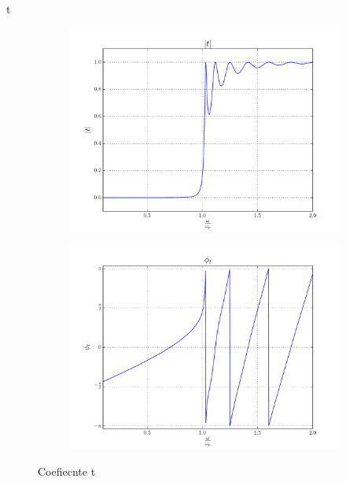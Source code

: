 \documentclass[a4paper,11pt]{article}
\begin{document}
t
\begin{figure}
    \begin{subfigure}[b]{0.48\textwidth}
        \includegraphics[width=\textwidth]{Punto1BC/t_N.pdf}
    \end{subfigure}
    \begin{subfigure}[b]{0.48\textwidth}
        \includegraphics[width=\textwidth]{Punto1BC/t_f.pdf}
    \end{subfigure}
    \caption{Coefiecnte t}\label{t}
\end{figure}
\end{document}
